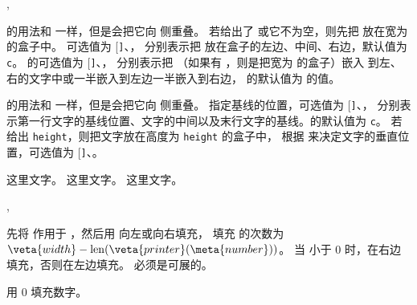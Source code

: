 \documentclass{cusdoc}
\begin{document}
\begin{function}{\makelapbox,\parlapbox}
  \begin{syntax}
    \V\makelapbox {}
    \V\makelapbox {}  
    \V\makelapbox {}   
    \V\parlapbox  {} 
    \V\parlapbox  {}    
    \V\parlapbox  {}     
  \end{syntax}

 的用法和  一样，但是会把它向  侧重叠。
若给出了  或它不为空，则先把  放在宽为  的盒子中。
 可选值为 [\texttt]{、}，
分别表示把  放在盒子的左边、中间、右边，默认值为 \texttt{c}。
 的可选值为 [\texttt]{、}，
分别表示把 （如果有 ，则是把宽为  的盒子）嵌入
到左、右的文字中或一半嵌入到左边一半嵌入到右边， 的默认值为  的值。

 的用法和  一样，但是会把它向  侧重叠。
 指定基线的位置，可选值为 [\texttt]{、}，
分别表示第一行文字的基线位置、文字的中间以及末行文字的基线。的默认值为 \texttt{c}。
若给出 \texttt{height}，则把文字放在高度为 \texttt{height} 的盒子中，
根据  来决定文字的垂直位置，可选值为 [\texttt]{、}。
\end{function}

\begin{xample}
这里文字。
这里文字。
这里文字。
\stopxamplecode
\xampleprint
\end{xample}

\begin{function}[rEXP]{\numberfixedwidth,\numerzerofill}
  \begin{syntax}
    \V\numberfixedwidth {}   
    \V\numberzerofill {} 
  \end{syntax}
先将  作用于 ，然后用  向左或向右填充，
填充  的次数为 $\veta{width}-\mathrm{len}(\veta{printer}(\meta{number}))$。
当  小于 0 时，在右边填充，否则在左边填充。
 必须是可展的。

 用 0 填充数字。
\end{function}
\end{document}
